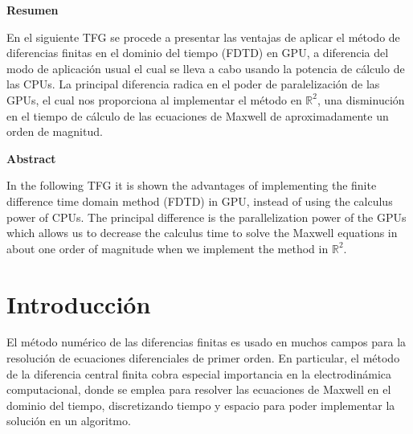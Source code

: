 \documentclass[11pt,a4paper,twoside,pdf]{article}
\numberwithin{equation}{section}
\begin{document}
\begin{center}

{\bf Resumen}
\bigskip

\begin{minipage}{0.8\linewidth}
En el siguiente TFG se procede a presentar las ventajas de aplicar el método de diferencias finitas en el dominio del tiempo (FDTD) en GPU, a diferencia del modo de aplicación usual el cual se lleva a cabo usando la potencia de cálculo de las CPUs. La principal diferencia radica en el poder de paralelización de las GPUs, el cual nos proporciona al implementar el método en $\mathbb R^{2}$, una disminución en el tiempo de cálculo de las ecuaciones de Maxwell de aproximadamente un orden de magnitud.

\end{minipage}

\vfill

{\bf Abstract} 
\bigskip

\begin{minipage}{0.8\linewidth}
In the following TFG it is shown the advantages of implementing the finite difference time domain method (FDTD) in GPU, instead of using the calculus power of CPUs. The principal difference is the parallelization power of the GPUs which allows us to decrease the calculus time to solve the Maxwell equations in about one order of magnitude when we implement the method in $\mathbb R^{2}$.
\end{minipage}

\vfill

\end{center}

\newpage

\tableofcontents

\newpage

\pagestyle{fancy}
\fancyhead[RO,LE]{\leftmark}
\fancyhead[LO,RE]{\thepage}
\fancyfoot{}

\section{Introducción}
El método numérico de las diferencias finitas es usado en muchos campos para la resolución de ecuaciones diferenciales de primer orden. En particular, el método de la diferencia central finita cobra especial importancia en la electrodinámica computacional, donde se emplea para resolver las ecuaciones de Maxwell en el dominio del tiempo, discretizando tiempo y espacio para poder implementar la solución en un algoritmo.
\end{document}
